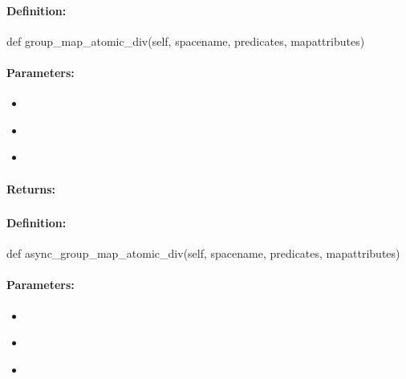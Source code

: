\paragraph{Definition:}
\begin{pythoncode}
def group_map_atomic_div(self, spacename, predicates, mapattributes)
\end{pythoncode}

\paragraph{Parameters:}
\begin{itemize}[noitemsep]
\item {}\\

\item {}\\

\item {}\\

\end{itemize}

\paragraph{Returns:}


\pagebreak
\subsubsection{}
\label{api:python:async_group_map_atomic_div}


\paragraph{Definition:}
\begin{pythoncode}
def async_group_map_atomic_div(self, spacename, predicates, mapattributes)
\end{pythoncode}

\paragraph{Parameters:}
\begin{itemize}[noitemsep]
\item {}\\

\item {}\\

\item {}\\

\end{itemize}

